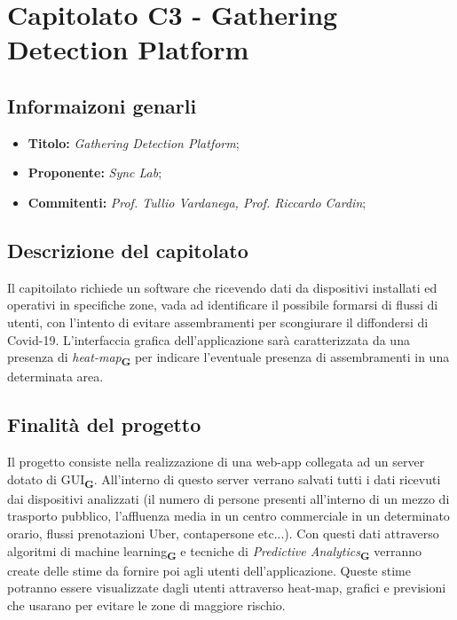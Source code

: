 \section{Capitolato C3 - Gathering Detection Platform}
\subsection{Informaizoni genarli}
\begin{itemize}
    \item \textbf{Titolo:} \textit{Gathering Detection Platform};
    \item \textbf{Proponente:} \textit{Sync Lab};
    \item \textbf{Commitenti:} \textit{Prof. Tullio Vardanega, Prof. Riccardo Cardin};
\end{itemize}
\subsection{Descrizione del capitolato}
Il capitoilato richiede un software che ricevendo dati da dispositivi installati ed operativi in specifiche zone, 
vada ad identificare il possibile formarsi di flussi di utenti, con l'intento di evitare assembramenti per scongiurare il diffondersi di Covid-19.
L'interfaccia grafica dell'applicazione sarà caratterizzata da una presenza di \textit{heat-map}\textsubscript{\textbf{G}} per indicare l'eventuale presenza di assembramenti in una determinata area.
\subsection{Finalità del progetto}
Il progetto consiste nella realizzazione di una web-app collegata ad un server dotato di GUI\textsubscript{\textbf{G}}. All'interno di questo server verrano salvati tutti i dati ricevuti dai dispositivi analizzati (il numero di persone presenti all'interno di un mezzo di trasporto pubblico, l'affluenza media in un centro commerciale in un determinato orario, flussi prenotazioni Uber, contapersone etc...). Con questi dati attraverso algoritmi di machine learning\textsubscript{\textbf{G}} e tecniche di \textit{Predictive Analytics}\textsubscript{\textbf{G}} verranno create delle stime da fornire poi agli utenti dell'applicazione. 
Queste stime potranno essere visualizzate dagli utenti attraverso heat-map, grafici e previsioni che usarano per evitare le zone di maggiore rischio.

